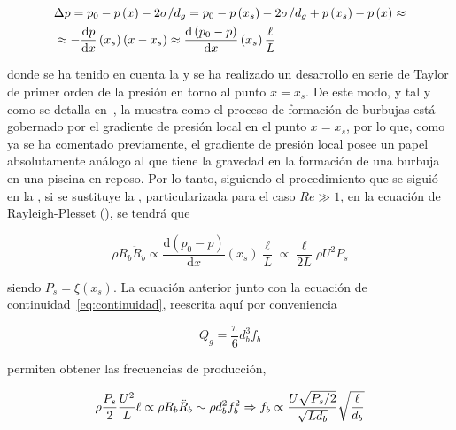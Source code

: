 \begin{equation}
\begin{split}
&\Delta p = p_{0} - p\left(x\right) - 2\sigma/d_{g} = p_{0} - p\left(x_{s}\right) - 2\sigma/d_{g} + p\left(x_{s}\right) - p\left(x\right) \approx \\
& \approx - \dfrac{\mathrm{d}p}{\mathrm{d} x}\left(x_{s}\right)\left(x-x_{s}\right) \approx \dfrac{\mathrm{d}\left(p_{0}-p\right)}{\mathrm{d}x}\left(x_{s}\right)\dfrac{\ell}{L}
\end{split}
\LABEQ{gradPress}
\end{equation}

donde se ha tenido en cuenta la  y se ha realizado un desarrollo en serie de Taylor de primer orden de la presión en torno al punto $x = x_{s}$. De este modo, y tal y como se detalla en~\cite{Evangelio2015b}, la  muestra como el proceso de formación de burbujas está gobernado por el gradiente de presión local en el punto $x = x_{s}$, por lo que, como ya se ha comentado previamente, el gradiente de presión local posee un papel absolutamente análogo al que tiene la gravedad en la formación de una burbuja en una piscina en reposo. Por lo tanto, siguiendo el procedimiento que se siguió en la , si se sustituye la , particularizada para el caso $Re \gg 1$, en la ecuación de Rayleigh-Plesset (), se tendrá que 

\begin{equation}
\rho R_{b}\ddot{R}_{b} \propto \dfrac{\mathrm{d}\left(p_{0} - p\right)}{\mathrm{d}x}\left(x_{s}\right)\dfrac{\ell}{L}\propto \dfrac{\ell}{2L}\rho U^{2} P_{s}
\end{equation}

siendo $P_{s} = \dot{\xi}\left(x_{s}\right)$. La ecuación anterior junto con la ecuación de continuidad~\eqref{eq:continuidad}, reescrita aquí por conveniencia

\begin{equation}
Q_{g} = \dfrac{\pi}{6}d_{b}^{3} f_{b}
\end{equation}

permiten obtener las frecuencias de producción,

\begin{equation}
\rho \dfrac{P_{s}}{2}\dfrac{U^{2}}{L}\ell \propto \rho R_{b} \ddot{R}_{b} \sim \rho d_{b}^{2}f_{b}^{2} \Rightarrow f_{b} \propto \dfrac{U\sqrt{P_{s}/2}}{\sqrt{L d_{b}}}\sqrt{\dfrac{\ell}{d_{b}}}
\LABEQ{freqGradPres}
\end{equation}

